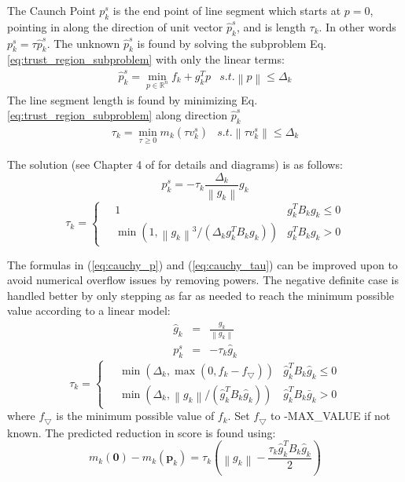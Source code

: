 \documentclass[peerreview,onecolumn]{IEEEtran}
\newcommand{\R}{\mathbb{R}}
\newcommand{\norm}[1]{\left\lVert#1\right\rVert}
\begin{document}
The Caunch Point $p^s_k$ is the end point of line segment which starts at $p=0$, pointing in along the direction of unit vector $\hat{p}^s_k$, and is length $\tau_k$. In other words $p^s_k = \tau \hat{p}^s_k$. The unknown $\hat{p}^s_k$ is found by solving the subproblem Eq. \ref{eq:trust_region_subproblem} with only the linear terms:
\begin{equation}
\begin{array}{lr}
\hat{p}^s_k = \min\limits_{p\in \R^n} f_k + g_k^T p & s.t. \norm{p} \le \Delta_k
\end{array}
\end{equation}
The line segment length is found by minimizing Eq. \ref{eq:trust_region_subproblem} along direction $\hat{p}^s_k$
\begin{equation}
\begin{array}{lr}
\tau_k = \min\limits_{\tau \ge 0} m_k(\tau v^s_k) & s.t. \norm{\tau v^s_k} \le \Delta_k
\end{array}
\end{equation}

The solution (see Chapter 4 of \cite{numopt2006} for details and diagrams) is as follows:
\begin{equation}
p^s_k = -\tau_k \frac{\Delta_k}{\norm{g_k}}g_k
\label{eq:cauchy_p}
\end{equation}
\begin{equation}
\tau_k = 
	\begin{cases}
		\quad 1 & g_k^T B_k g_k \le 0 \\
		\quad \min\left(1,\norm{g_k}^3/(\Delta_k g_k^T B_k g_k)\right) & g_k^T B_k g_k > 0
	\end{cases}
	\label{eq:cauchy_tau}
\end{equation}

The formulas in (\ref{eq:cauchy_p}) and (\ref{eq:cauchy_tau}) can be improved upon to avoid numerical overflow issues by removing powers. The negative definite case is handled better by only stepping as far as needed to reach the minimum possible value according to a linear model:
\begin{eqnarray}
\hat{g}_k &=& \frac{g_k}{\norm{g_k}} \\
p^s_k &=& -\tau_k \hat{g}_k
\end{eqnarray}
\begin{equation}
\tau_k = \begin{cases}
		\quad \min\left(\Delta_k, \max(0,f_k-f_{\bigtriangledown}) \right) & \hat{g}_k^T B_k \hat{g}_k\le 0 \\
		\quad \min\left(\Delta_k,\norm{g_k}/(\hat{g}_k^T B_k \hat{g}_k)\right) & \hat{g}_k^T B_k \bar{g}_k > 0
	\end{cases}
\end{equation}
where $f_{\bigtriangledown}$ is the minimum possible value of $f_k$. Set $f_{\bigtriangledown}$ to -MAX\_VALUE if not known. The predicted reduction in score is found using:
\begin{equation}
m_k(\bm{0})-m_k(\bm{p}_k) = \tau_k\left(\norm{g_k} - \frac{\tau_k \hat{g}_k^T B_k \hat{g}_k}{2} \right)
\end{equation}
\end{document}
